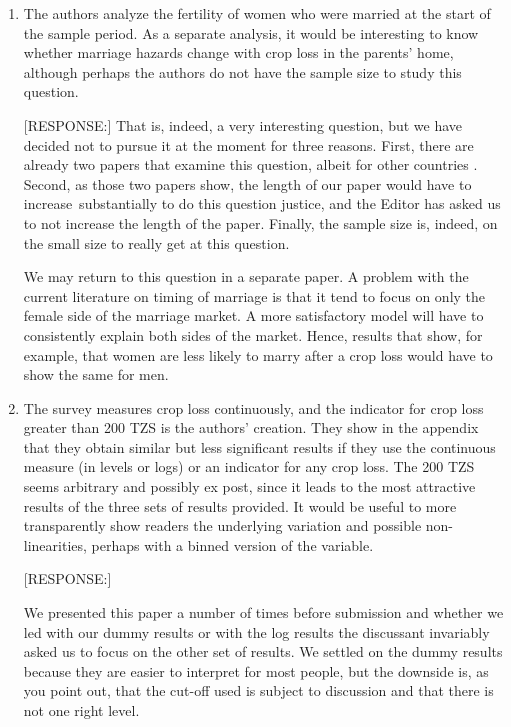 \documentclass[letterpaper,12pt]{article}
\begin{document}
\begin{enumerate}
\item The authors analyze the fertility of women who were married at the
start of the sample period. As a separate analysis, it would be
interesting to know whether marriage hazards change with crop loss in
the parents' home, although perhaps the authors do not have the sample
size to study this question.

[RESPONSE:] That is, indeed, a very interesting question, but we have 
decided not to pursue it at the moment for three reasons.
First, there are already two papers that examine this question, 
albeit for other countries \citet{mbiti2008,Hoogeveen2011}.
Second, as those two papers show, the length of our paper would have
to increase substantially to do this question justice, and the Editor
has asked us to not increase the length of the paper.
Finally, the sample size is, indeed, on the small size to really get 
at this question.

We may return to this question in a separate paper.
A problem with the current literature on timing of marriage
is that it tend to focus on only the female side of the marriage market.
A more satisfactory model will have to consistently explain both sides 
of the market.
Hence, results that show, for example, that women are less likely to
marry after a crop loss would have to show the same for men. 


\item The survey measures crop loss continuously, and the indicator for
crop loss greater than 200 TZS is the authors' creation. They show in
the appendix that they obtain similar but less significant results if
they use the continuous measure (in levels or logs) or an indicator for
any crop loss. The 200 TZS seems arbitrary and possibly ex post, since
it leads to the most attractive results of the three sets of results
provided. It would be useful to more transparently show readers the
underlying variation and possible non-linearities, perhaps with a binned
version of the variable.

[RESPONSE:]

We presented this paper a number of times before submission and whether 
we led with our dummy results or with the log results the discussant 
invariably asked us to focus on the other set of results.
We settled on the dummy results because they are easier to interpret 
for most people, but the downside is, as you point out, that the 
cut-off used is subject to discussion and that there is not one right level.


\end{enumerate}
\end{document}
